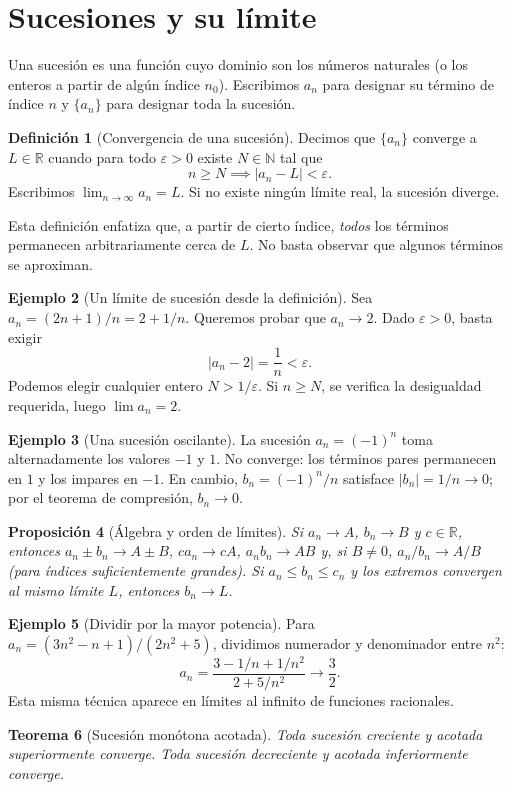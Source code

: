 \documentclass[12pt]{article}
\newtheorem{teorema}{Teorema}[section]
\newtheorem{proposicion}[teorema]{Proposición}
\theoremstyle{definition}
\newtheorem{definicion}[teorema]{Definición}
\newtheorem{ejemplo}[teorema]{Ejemplo}
\theoremstyle{remark}
\newcommand{\R}{\mathbb{R}}
\begin{document}
\section{Sucesiones y su límite}
Una sucesión es una función cuyo dominio son los números naturales (o los enteros a partir de algún índice $n_0$). Escribimos $a_n$ para designar su término de índice $n$ y $\{a_n\}$ para designar toda la sucesión.
\begin{definicion}[Convergencia de una sucesión]
Decimos que $\{a_n\}$ converge a $L\in\R$ cuando para todo $\varepsilon>0$ existe $N\in\mathbb N$ tal que
\[\boxed{n\ge N\implies |a_n-L|<\varepsilon.}\]
Escribimos $\lim_{n\to\infty}a_n=L$. Si no existe ningún límite real, la sucesión diverge.
\end{definicion}
Esta definición enfatiza que, a partir de cierto índice, \emph{todos} los términos permanecen arbitrariamente cerca de $L$. No basta observar que algunos términos se aproximan.
\begin{ejemplo}[Un límite de sucesión desde la definición]
Sea $a_n=(2n+1)/n=2+1/n$. Queremos probar que $a_n\to2$. Dado $\varepsilon>0$, basta exigir
\[|a_n-2|=\frac1n<\varepsilon.\]
Podemos elegir cualquier entero $N>1/\varepsilon$. Si $n\ge N$, se verifica la desigualdad requerida, luego $\boxed{\lim a_n=2}$.
\end{ejemplo}
\begin{ejemplo}[Una sucesión oscilante]
La sucesión $a_n=(-1)^n$ toma alternadamente los valores $-1$ y $1$. No converge: los términos pares permanecen en $1$ y los impares en $-1$. En cambio, $b_n=(-1)^n/n$ satisface $|b_n|=1/n\to0$; por el teorema de compresión, $b_n\to0$.
\end{ejemplo}
\begin{proposicion}[Álgebra y orden de límites]
Si $a_n\to A$, $b_n\to B$ y $c\in\R$, entonces $a_n\pm b_n\to A\pm B$, $ca_n\to cA$, $a_nb_n\to AB$ y, si $B\ne0$, $a_n/b_n\to A/B$ (para índices suficientemente grandes). Si $a_n\le b_n\le c_n$ y los extremos convergen al mismo límite $L$, entonces $b_n\to L$.
\end{proposicion}
\begin{ejemplo}[Dividir por la mayor potencia]
Para $a_n=(3n^2-n+1)/(2n^2+5)$, dividimos numerador y denominador entre $n^2$:
\[a_n=\frac{3-1/n+1/n^2}{2+5/n^2}
\longrightarrow\boxed{\frac32}.\]
Esta misma técnica aparece en límites al infinito de funciones racionales.
\end{ejemplo}
\begin{teorema}[Sucesión monótona acotada]
Toda sucesión creciente y acotada superiormente converge. Toda sucesión decreciente y acotada inferiormente converge.
\end{teorema}
\end{document}
